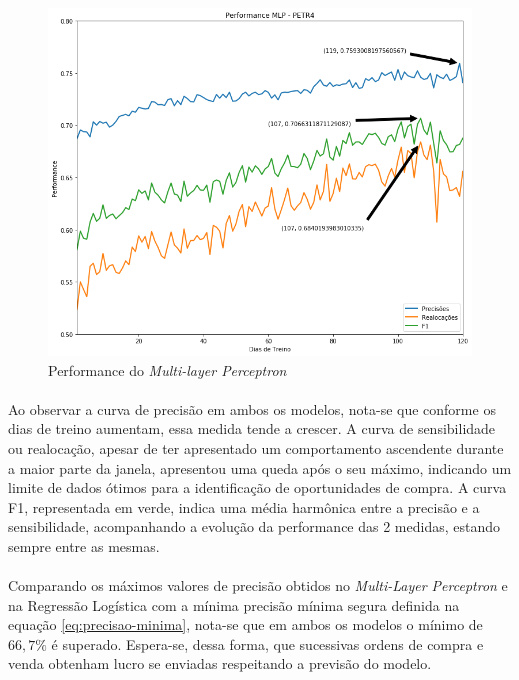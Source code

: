 \documentclass[grad,numbers]{coppe}
\begin{document}
        \begin{figure}[h!]
            \caption{Performance do \textit{Multi-layer Perceptron}}
            \label{img:performance-mlp}
            \includegraphics[width=13.1cm]{mlp-performance.png}
            \centering
        \end{figure}
        
        \paragraph{}Ao observar a curva de precisão em ambos os modelos, nota-se que conforme os dias de treino aumentam, essa medida tende a crescer. A curva de sensibilidade ou realocação, apesar de ter apresentado um comportamento ascendente durante a maior parte da janela, apresentou uma queda após o seu máximo, indicando um limite de dados ótimos para a identificação de oportunidades de compra. A curva F1, representada em verde, indica uma média harmônica entre a precisão e a sensibilidade, acompanhando a evolução da performance das 2 medidas, estando sempre entre as mesmas.
        
        \paragraph{}Comparando os máximos valores de precisão obtidos no \textit{Multi-Layer Perceptron} e na Regressão Logística com a mínima precisão mínima segura definida na equação \ref{eq:precisao-minima}, nota-se que em ambos os modelos o mínimo de $66,7\%$ é superado. Espera-se, dessa forma, que sucessivas ordens de compra e venda obtenham lucro se enviadas respeitando a previsão do modelo.
        
\end{document}

